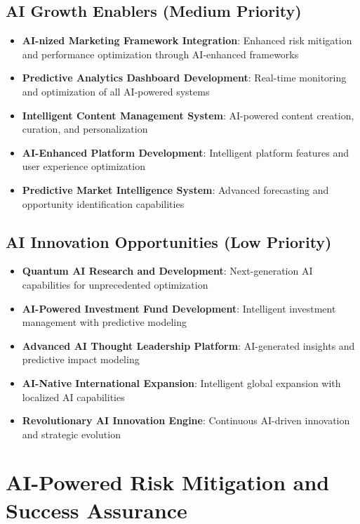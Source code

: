 \subsection{AI Growth Enablers (Medium Priority)}

\begin{itemize}
    \item \textbf{AI-nized Marketing Framework Integration}: Enhanced risk mitigation and performance optimization through AI-enhanced frameworks
    \item \textbf{Predictive Analytics Dashboard Development}: Real-time monitoring and optimization of all AI-powered systems
    \item \textbf{Intelligent Content Management System}: AI-powered content creation, curation, and personalization
    \item \textbf{AI-Enhanced Platform Development}: Intelligent platform features and user experience optimization
    \item \textbf{Predictive Market Intelligence System}: Advanced forecasting and opportunity identification capabilities
\end{itemize}

\subsection{AI Innovation Opportunities (Low Priority)}

\begin{itemize}
    \item \textbf{Quantum AI Research and Development}: Next-generation AI capabilities for unprecedented optimization
    \item \textbf{AI-Powered Investment Fund Development}: Intelligent investment management with predictive modeling
    \item \textbf{Advanced AI Thought Leadership Platform}: AI-generated insights and predictive impact modeling
    \item \textbf{AI-Native International Expansion}: Intelligent global expansion with localized AI capabilities
    \item \textbf{Revolutionary AI Innovation Engine}: Continuous AI-driven innovation and strategic evolution
\end{itemize}

\section{AI-Powered Risk Mitigation and Success Assurance}

